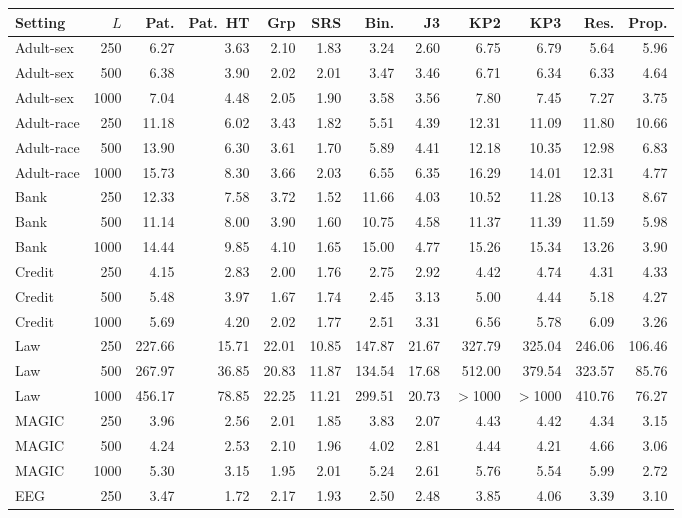 \begin{tabular}{lrrrrrrrrrrr}
\toprule
Setting & $L$ & Pat. & Pat.\ HT & Grp & SRS & Bin. & J3 & KP2 & KP3 & Res. & Prop. \\
\midrule
Adult-sex & 250 & 6.27 & 3.63 & 2.10 & 1.83 & 3.24 & 2.60 & 6.75 & 6.79 & 5.64 & 5.96 \\
Adult-sex & 500 & 6.38 & 3.90 & 2.02 & 2.01 & 3.47 & 3.46 & 6.71 & 6.34 & 6.33 & 4.64 \\
Adult-sex & 1000 & 7.04 & 4.48 & 2.05 & 1.90 & 3.58 & 3.56 & 7.80 & 7.45 & 7.27 & 3.75 \\
Adult-race & 250 & 11.18 & 6.02 & 3.43 & 1.82 & 5.51 & 4.39 & 12.31 & 11.09 & 11.80 & 10.66 \\
Adult-race & 500 & 13.90 & 6.30 & 3.61 & 1.70 & 5.89 & 4.41 & 12.18 & 10.35 & 12.98 & 6.83 \\
Adult-race & 1000 & 15.73 & 8.30 & 3.66 & 2.03 & 6.55 & 6.35 & 16.29 & 14.01 & 12.31 & 4.77 \\
Bank & 250 & 12.33 & 7.58 & 3.72 & 1.52 & 11.66 & 4.03 & 10.52 & 11.28 & 10.13 & 8.67 \\
Bank & 500 & 11.14 & 8.00 & 3.90 & 1.60 & 10.75 & 4.58 & 11.37 & 11.39 & 11.59 & 5.98 \\
Bank & 1000 & 14.44 & 9.85 & 4.10 & 1.65 & 15.00 & 4.77 & 15.26 & 15.34 & 13.26 & 3.90 \\
Credit & 250 & 4.15 & 2.83 & 2.00 & 1.76 & 2.75 & 2.92 & 4.42 & 4.74 & 4.31 & 4.33 \\
Credit & 500 & 5.48 & 3.97 & 1.67 & 1.74 & 2.45 & 3.13 & 5.00 & 4.44 & 5.18 & 4.27 \\
Credit & 1000 & 5.69 & 4.20 & 2.02 & 1.77 & 2.51 & 3.31 & 6.56 & 5.78 & 6.09 & 3.26 \\
Law & 250 & 227.66 & 15.71 & 22.01 & 10.85 & 147.87 & 21.67 & 327.79 & 325.04 & 246.06 & 106.46 \\
Law & 500 & 267.97 & 36.85 & 20.83 & 11.87 & 134.54 & 17.68 & 512.00 & 379.54 & 323.57 & 85.76 \\
Law & 1000 & 456.17 & 78.85 & 22.25 & 11.21 & 299.51 & 20.73 & $>$1000 & $>$1000 & 410.76 & 76.27 \\
MAGIC & 250 & 3.96 & 2.56 & 2.01 & 1.85 & 3.83 & 2.07 & 4.43 & 4.42 & 4.34 & 3.15 \\
MAGIC & 500 & 4.24 & 2.53 & 2.10 & 1.96 & 4.02 & 2.81 & 4.44 & 4.21 & 4.66 & 3.06 \\
MAGIC & 1000 & 5.30 & 3.15 & 1.95 & 2.01 & 5.24 & 2.61 & 5.76 & 5.54 & 5.99 & 2.72 \\
EEG & 250 & 3.47 & 1.72 & 2.17 & 1.93 & 2.50 & 2.48 & 3.85 & 4.06 & 3.39 & 3.10 \\

\end{tabular}
